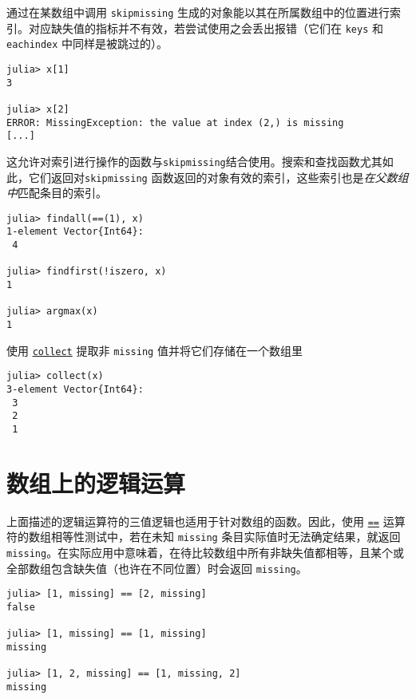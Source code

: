 通过在某数组中调用 \texttt{skipmissing} 生成的对象能以其在所属数组中的位置进行索引。对应缺失值的指标并不有效，若尝试使用之会丢出报错（它们在 \texttt{keys} 和 \texttt{eachindex} 中同样是被跳过的）。




\begin{verbatim}
julia> x[1]
3

julia> x[2]
ERROR: MissingException: the value at index (2,) is missing
[...]
\end{verbatim}



这允许对索引进行操作的函数与\texttt{skipmissing}结合使用。搜索和查找函数尤其如此，它们返回对\texttt{skipmissing} 函数返回的对象有效的索引，这些索引也是\emph{在父数组中}匹配条目的索引。




\begin{verbatim}
julia> findall(==(1), x)
1-element Vector{Int64}:
 4

julia> findfirst(!iszero, x)
1

julia> argmax(x)
1
\end{verbatim}



使用 \hyperlink{6278865767444641812}{\texttt{collect}} 提取非 \texttt{missing} 值并将它们存储在一个数组里




\begin{verbatim}
julia> collect(x)
3-element Vector{Int64}:
 3
 2
 1
\end{verbatim}



\hypertarget{15378768208982642165}{}


\section{数组上的逻辑运算}



上面描述的逻辑运算符的三值逻辑也适用于针对数组的函数。因此，使用 \hyperlink{15143149452920304570}{\texttt{==}} 运算符的数组相等性测试中，若在未知 \texttt{missing} 条目实际值时无法确定结果，就返回 \texttt{missing}。在实际应用中意味着，在待比较数组中所有非缺失值都相等，且某个或全部数组包含缺失值（也许在不同位置）时会返回 \texttt{missing}。




\begin{verbatim}
julia> [1, missing] == [2, missing]
false

julia> [1, missing] == [1, missing]
missing

julia> [1, 2, missing] == [1, missing, 2]
missing
\end{verbatim}



